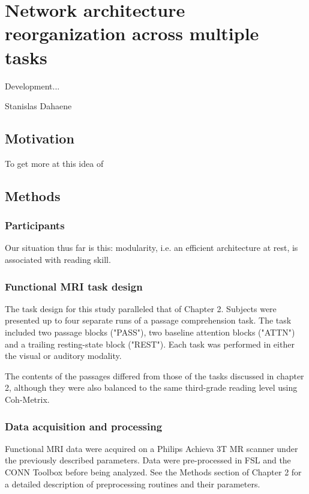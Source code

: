 \chapter{Network architecture reorganization across multiple tasks}

\epigraph{Development...}{Stanislas Dahaene}

\section{Motivation}

To get more at this idea of 


\section{Methods}

\subsection{Participants}

Our situation thus far is this: modularity, i.e. an efficient architecture at rest, is associated with reading skill. 




\subsection{Functional MRI task design}

The task design for this study paralleled that of Chapter 2. Subjects were presented up to four separate runs of a passage comprehension task. The task included two passage blocks ("PASS"), two baseline attention blocks ("ATTN") and a trailing resting-state block ("REST"). Each task was performed in either the visual or auditory modality.

The contents of the passages differed from those of the tasks discussed in chapter 2, although they were also balanced to the same third-grade reading level using Coh-Metrix. 

\subsection{Data acquisition and processing}

Functional MRI data were acquired on a Philips Achieva 3T MR scanner under the previously described parameters. Data were pre-processed in FSL and the CONN Toolbox before being analyzed. See the Methods section of Chapter 2 for a detailed description of preprocessing routines and their parameters.

